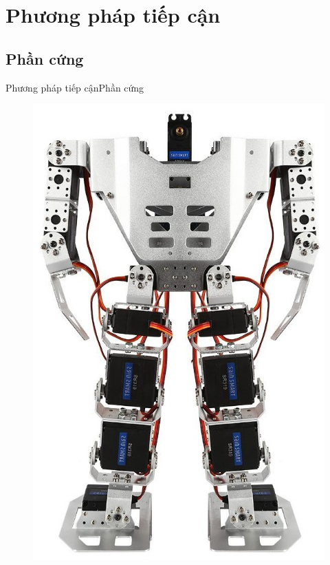 \documentclass[compress, blue, 13pt,hyperref={pdfpagemode=FullScreen}]{beamer}
\begin{document}
\section{Phương pháp tiếp cận}
\subsection{Phần cứng}
\begin{frame}{Phương pháp tiếp cận}{Phần cứng}
\begin{figure}[hbtp]
\centering
\begin{multicols}{2}
\includegraphics[scale=0.15]{images/01_150_2_1024x1024.jpg}
\columnbreak


\end{multicols}
\end{figure}
\end{frame}
\end{document}

